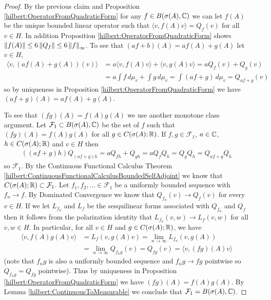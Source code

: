 \begin{proof}
By the previous claim and Proposition \ref{hilbert:OperatorFromQuadraticForm} for any $f \in B(\sigma(A), \mathbb{C})$ we can let $f(A)$ be the unique bounded linear operator such that $\langle v , f(A) v \rangle = Q_f(v)$ for all $v \in H$.   In addition Proposition \ref{hilbert:OperatorFromQuadraticForm} shows $\left \lVert f(A) \right \rVert \leq 6 \left \lVert Q_f \right \rVert \leq 6 \left \lVert f \right \rVert_\infty$.  
To see that $(af + b)(A) = af(A) + g(A)$ let $v \in H$,
\begin{align*}
\langle v, (af(A) + g(A))(v) \rangle &= a \langle v, f(A) v \rangle + \langle v, g(A) v \rangle = a Q_f(v) + Q_g(v) \\
&= a \int f \, d\mu_v + \int g \, d\mu_v = \int (af + g) \, d\mu_v = Q_{af +g}(v)
\end{align*}
so by uniqueness in Proposition \ref{hilbert:OperatorFromQuadraticForm} we have $(af+g)(A) = af(A) + g(A)$.

To see that $(fg)(A) = f(A) g(A)$ we use another monotone class argument.  Let $\mathcal{F}_1 \subset B(\sigma(A), \mathbb{C})$ be the set of $f$ such that $(fg)(A) = f(A) g(A)$ for all $g \in C(\sigma(A); \mathbb{R})$.  If $f,g \in \mathcal{F}_1$, $a \in \mathbb{C}$, $h \in C(\sigma(A); \mathbb{R})$ and $v \in H$ then
\begin{align*}
((af + g) h)Q_{(af +g)h} = a Q_{fh} + Q_{gh} = a Q_f Q_h = Q_g Q_h = Q_{af+g} Q_h 
\end{align*}
so $\mathcal{F}_1$.  By the Continuous Functional Calculus Theorem \ref{hilbert:ContinuousFunctionalCalculusBoundedSelfAdjoint} we know that $C(\sigma(A); \mathbb{R}) \subset \mathcal{F}_1$.  Let $f_1, f_2, \dotsc \in \mathcal{F}_1$ be a uniformly bounded sequence with $f_n \to f$.  By Dominated Convergence we know that $Q_{f_n}(v) \to Q_f(v)$ for every $v \in H$.  If we let $L_{f_n}$ and $L_f$ be the sesquilinear forms associated with $Q_{f_n}$ and $Q_f$ then it follows from the polarization identity that $L_{f_n}(v,w)  \to L_f(v,w)$ for all $v,w \in H$.  In particular, for all $v \in H$ and $g \in C(\sigma(A); \mathbb{R})$, we have 
\begin{align*}
  \langle v, f(A)g(A) v \rangle &= L_f(v, g(A)v) = \lim_{n \to \infty} L_{f_n}(v, g(A)) \\
                                &= \lim_{n \to \infty} Q_{f_ng}(v) = Q_{fg}(v) = \langle v, (fg)(A) v \rangle
\end{align*}
(note that $f_n g$ is also a uniformly bounded sequence and $f_n g \to fg$ pointwise so $Q_{f_ng} = Q_{fg}$ pointwise).  Thus by uniqueness in Proposition \ref{hilbert:OperatorFromQuadraticForm} we have $(fg)(A) = f(A) g(A)$. By Lemma \ref{hilbert:ContinuousToMeasurable} we conclude that $\mathcal{F}_1 = B(\sigma(A), \mathbb{C})$.


\end{proof}
